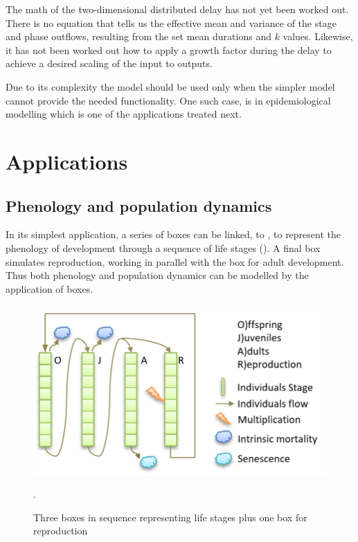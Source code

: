 The math of the two-dimensional distributed delay has not yet been worked out. There is no equation that tells us the effective mean and variance of the stage and phase outflows, resulting from the set mean durations and $k$ values. Likewise, it has not been worked out how to apply a growth factor during the delay to achieve a desired scaling of the input to outputs. 

Due to its complexity the  model should be used only when the simpler  model cannot provide the needed functionality. One such case, is in epidemiological modelling which is one of the applications treated next.

\FloatBarrier
\section{Applications}
\label{ch:devappl}
\subsection{Phenology and population dynamics}
In its simplest application, a series of  boxes can be linked,  to , to represent the phenology of development through a sequence of life stages (). A final  box simulates reproduction, working in parallel with the  box for adult development. Thus both phenology and population dynamics can be modelled by the application of  boxes.

\begin{figure} [ht]
\centering
\includegraphics[width=.9\textwidth]{graphics/phys-dev-appl-1}
\caption{Three  boxes in sequence representing life stages plus one  box for reproduction}. 
\label{fig:phys-dev-appl-1}
\end{figure}

